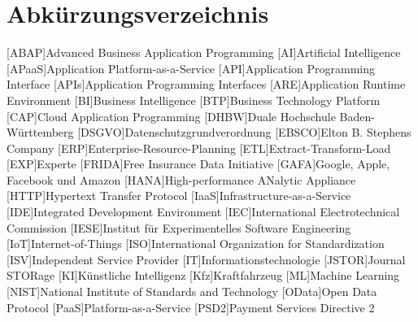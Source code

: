 \clearpage
\chapter*{Abkürzungsverzeichnis}	

\begin{acronym}[XXXXXXX]
	[ABAP]{Advanced Business Application Programming}
	[AI]{Artificial Intelligence}
	[APaaS]{Application Platform-as-a-Service}
	[API]{Application Programming Interface}
	[APIs]{Application Programming Interfaces}	
	[ARE]{Application Runtime Environment}
	[BI]{Business Intelligence}
	[BTP]{Business Technology Platform}
	[CAP]{Cloud Application Programming}
	[DHBW]{Duale Hochschule Baden-Württemberg}
	[DSGVO]{Datenschutzgrundverordnung}
	[EBSCO]{Elton B. Stephens Company}
	[ERP]{Enterprise-Resource-Planning}
	[ETL]{Extract-Transform-Load}
	[EXP]{Experte}
	[FRIDA]{Free Insurance Data Initiative}
	[GAFA]{Google, Apple, Facebook und Amazon}
	[HANA]{High-performance ANalytic Appliance}
	[HTTP]{Hypertext Transfer Protocol}
	[IaaS]{Infrastructure-as-a-Service}
	[IDE]{Integrated Development Environment}
	[IEC]{International Electrotechnical Commission}
	[IESE]{Institut für Experimentelles Software Engineering}
	[IoT]{Internet-of-Things}
	[ISO]{International Organization for Standardization}
	[ISV]{Independent Service Provider}
	[IT]{Informationstechnologie}
	[JSTOR]{Journal STORage}
	[KI]{Künstliche Intelligenz}
	[Kfz]{Kraftfahrzeug}
	[ML]{Machine Learning}
	[NIST]{National Institute of Standards and Technology}
	[OData]{Open Data Protocol}
	[PaaS]{Platform-as-a-Service}
	[PSD2]{Payment Services Directive 2}

\end{acronym}
